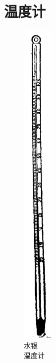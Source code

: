 \section{温度计}\label{sec:2-3}

\begin{figure}
    \begin{minipage}{2.5cm}
    \centering
    \includegraphics[width=1.5cm]{../pic/czwl2-ch2-9}
    \caption{水银\\温度计}\label{fig:2-9}
    \end{minipage}
    \qquad
    \begin{minipage}{2.5cm}
    \centering
    \vspace{1.8cm}

\end{minipage}
\end{figure}
